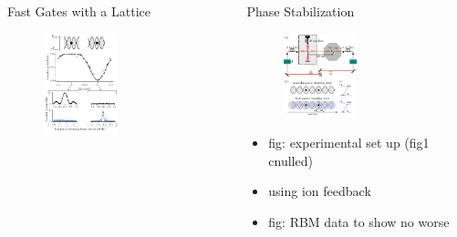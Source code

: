 \documentclass[final]{beamer}
\begin{document}
\begin{frame}{}
\begin{center}
\begin{columns}[t]
\begin{column}{0.49\textwidth}
\begin{block}{Fast Gates with a Lattice}
      \begin{figure}
        \includegraphics[width=0.5\textwidth]{./figs/Figure_2_v2.pdf}
      \end{figure}

    \end{block}

  \end{column}


  \begin{column}{0.49\textwidth}

    \begin{block}{Phase Stabilization}

      \begin{figure}
        \includegraphics[width=0.5\textwidth]{./figs/setup+beams_horizontal.pdf}
      \end{figure}

      \begin{itemize}
      \item fig: experimental set up (fig1 cnulled)
      \item using ion feedback
      \item fig: RBM data to show no worse
      \end{itemize}
    \end{block}



\end{column}
\end{columns}
\end{center}
\end{frame}
\end{document}
